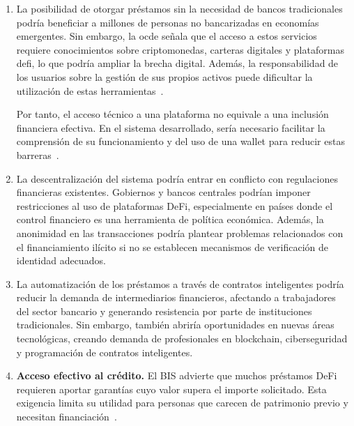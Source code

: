 \begin{enumerate}
     \item La posibilidad de otorgar préstamos sin la necesidad de bancos tradicionales
      podría beneficiar a millones de personas no bancarizadas en economías emergentes.
       Sin embargo, la \acrfull{ocde} señala que el acceso a estos servicios
       requiere conocimientos sobre criptomonedas, carteras digitales y plataformas
       \gls{defi}, lo que podría ampliar la brecha digital. Además, la responsabilidad
       de los usuarios sobre la gestión de sus propios activos puede dificultar la
       utilización de estas herramientas~\cite{oecd2024defi}.

          Por tanto,
    el acceso técnico a una plataforma no equivale a una inclusión
    financiera efectiva. En el sistema desarrollado, sería necesario
    facilitar la comprensión de su funcionamiento y del uso de
    una \gls{wallet} para reducir estas barreras~\cite{oecd2024defi}.

     \item La descentralización del sistema podría entrar en conflicto con regulaciones financieras
      existentes. Gobiernos y bancos centrales podrían imponer restricciones al uso de plataformas DeFi,
       especialmente en países donde el control financiero es una herramienta de política económica.
        Además, la anonimidad en las transacciones podría plantear problemas relacionados con el
         financiamiento ilícito si no se establecen mecanismos de verificación de identidad adecuados.

     \item La automatización de los préstamos a través de contratos inteligentes podría reducir la
      demanda de intermediarios financieros, afectando a trabajadores del sector bancario y generando
       resistencia por parte de instituciones tradicionales. Sin embargo, también abriría oportunidades
        en nuevas áreas tecnológicas, creando demanda de profesionales en blockchain, ciberseguridad y
         programación de contratos inteligentes.
     \item \textbf{Acceso efectivo al crédito.}
    El BIS advierte que muchos préstamos DeFi requieren aportar
    garantías cuyo valor supera el importe solicitado. Esta
    exigencia limita su utilidad para personas que carecen de
    patrimonio previo y necesitan financiación~\cite{aramonte2022defi}.

\end{enumerate}


